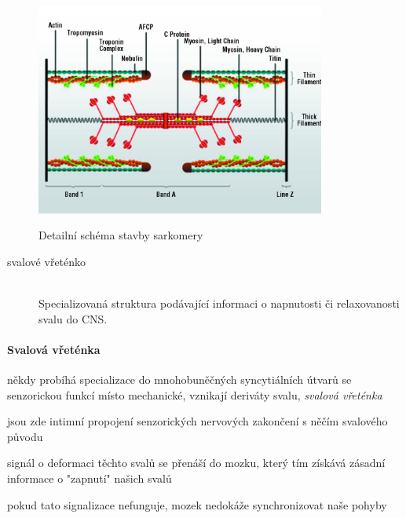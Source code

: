 \documentclass[DIV=8]{scrreprt}
\begin{document}
\begin{figure}
    \caption{Detailní schéma stavby sarkomery}
    \includegraphics[width=0.85\textwidth]{sarkomera.jpg}
    \centering
    \label{}
\end{figure}


\begin{description}
\item[svalové vřeténko]\hfill \\
Specializovaná struktura podávající informaci o napnutosti či relaxovanosti svalu do CNS.

\end{description}


\paragraph{Svalová vřeténka}
\begin{myItemize}[nosep]
    \item někdy probíhá specializace do mnohobuněčných syncytiálních útvarů se senzorickou funkcí místo mechanické, vznikají deriváty svalu, \emph{svalová vřeténka}
    \item jsou zde intimní propojení senzorických nervových zakončení s něčím svalového původu
    \item signál o deformaci těchto svalů se přenáší do mozku, který tím získává zásadní informace o "zapnutí" našich svalů
\begin{myItemize}[nosep]
    \item pokud tato signalizace nefunguje, mozek nedokáže synchronizovat naše pohyby
\end{myItemize}

\end{myItemize}
\end{document}
